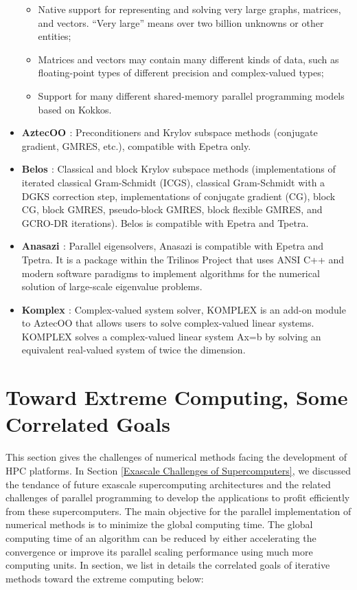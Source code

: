 \begin{itemize}
	\begin{itemize}
		\item Native support for representing and solving very large graphs, matrices, and vectors.  “Very large” means over two billion unknowns or other entities;
		\item Matrices and vectors may contain many different kinds of data, such as floating-point types of different precision and complex-valued types;
		\item Support for many different shared-memory parallel programming models based on Kokkos.
	\end{itemize}
	
	\item \textbf{AztecOO \cite{heroux2004aztecoo}}: Preconditioners and Krylov subspace methods (conjugate gradient, GMRES, etc.), compatible with Epetra only.
	\item \textbf{Belos \cite{bavier2012amesos2}}: Classical and block Krylov subspace methods (implementations of iterated classical Gram-Schmidt (ICGS), classical Gram-Schmidt with a DGKS correction step, implementations of conjugate gradient (CG), block CG, block GMRES, pseudo-block GMRES, block flexible GMRES, and GCRO-DR iterations). Belos is compatible with Epetra and Tpetra.
	\item \textbf{Anasazi \cite{baker2009anasazi}}: Parallel eigensolvers, Anasazi is compatible with Epetra and Tpetra. It is a package within the Trilinos Project that uses ANSI C++ and modern software paradigms to implement algorithms for the numerical solution of large-scale eigenvalue problems.
	\item \textbf{Komplex \cite{day2001solving}}: Complex-valued system solver, KOMPLEX is an add-on module to AztecOO that allows users to solve complex-valued linear systems. KOMPLEX solves a complex-valued linear system Ax=b by solving an equivalent real-valued system of twice the dimension.
\end{itemize}

\section{Toward Extreme Computing, Some Correlated Goals}

This section gives the challenges of numerical methods facing the development of HPC platforms. In Section \ref{Exascale Challenges of Supercomputers}, we discussed the tendance of future exascale supercomputing architectures and the related challenges of parallel programming to develop the applications to profit efficiently from these supercomputers. The main objective for the parallel implementation of numerical methods is to minimize the global computing time. The global computing time of an algorithm can be reduced by either accelerating the convergence or improve its parallel scaling performance using much more computing units. In section, we list in details the correlated goals of iterative methods toward the extreme computing below:

